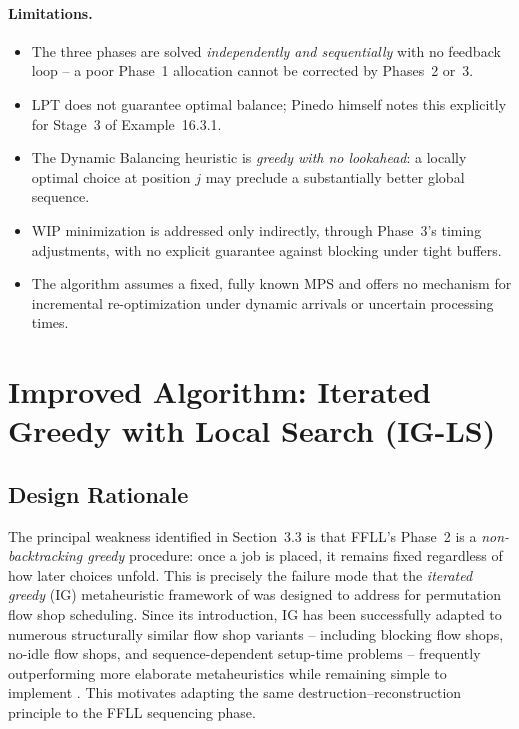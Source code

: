 \documentclass[11pt,a4paper]{article}
\begin{document}
\paragraph{Limitations.}
\begin{itemize}
  \item The three phases are solved \emph{independently and sequentially}
    with no feedback loop -- a poor Phase~1 allocation cannot be corrected
    by Phases~2 or~3.
  \item LPT does not guarantee optimal balance; Pinedo himself notes this
    explicitly for Stage~3 of Example~16.3.1.
  \item The Dynamic Balancing heuristic is \emph{greedy with no lookahead}:
    a locally optimal choice at position $j$ may preclude a substantially
    better global sequence.
  \item WIP minimization is addressed only indirectly, through Phase~3's
    timing adjustments, with no explicit guarantee against blocking under
    tight buffers.
  \item The algorithm assumes a fixed, fully known MPS and offers no
    mechanism for incremental re-optimization under dynamic arrivals or
    uncertain processing times.
\end{itemize}

\section{Improved Algorithm: Iterated Greedy with Local Search (IG-LS)}

\subsection{Design Rationale}

The principal weakness identified in Section~3.3 is that FFLL's Phase~2
is a \emph{non-backtracking greedy} procedure: once a job is placed,
it remains fixed regardless of how later choices unfold. This is precisely
the failure mode that the \emph{iterated greedy} (IG) metaheuristic
framework of \citet{ruiz2007simple} was designed to address for
permutation flow shop scheduling. Since its introduction, IG has been
successfully adapted to numerous structurally similar flow shop variants
-- including blocking flow shops, no-idle flow shops, and sequence-dependent
setup-time problems -- frequently outperforming more elaborate metaheuristics
while remaining simple to implement
\citep{ruiz2007simple,pan2014effective}. This motivates adapting the
same destruction--reconstruction principle to the FFLL sequencing phase.
\end{document}
